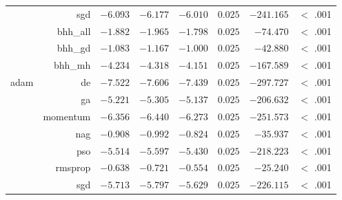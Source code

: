 \begin{table}[htb]
{\begin{tabular}{lrrrrrrr}
			                     & sgd                  & $-6.093$             & $-6.177$                                        & $-6.010$             & $0.025$              & $-241.165$           & $<$ .001    \\
			                     & bhh\_all             & $-1.882$             & $-1.965$                                        & $-1.798$             & $0.025$              & $-74.470$            & $<$ .001    \\
			                     & bhh\_gd              & $-1.083$             & $-1.167$                                        & $-1.000$             & $0.025$              & $-42.880$            & $<$ .001    \\
			                     & bhh\_mh              & $-4.234$             & $-4.318$                                        & $-4.151$             & $0.025$              & $-167.589$           & $<$ .001    \\
			adam                 & de                   & $-7.522$             & $-7.606$                                        & $-7.439$             & $0.025$              & $-297.727$           & $<$ .001    \\
			$ $                  & ga                   & $-5.221$             & $-5.305$                                        & $-5.137$             & $0.025$              & $-206.632$           & $<$ .001    \\
			                     & momentum             & $-6.356$             & $-6.440$                                        & $-6.273$             & $0.025$              & $-251.573$           & $<$ .001    \\
			                     & nag                  & $-0.908$             & $-0.992$                                        & $-0.824$             & $0.025$              & $-35.937$            & $<$ .001    \\
			                     & pso                  & $-5.514$             & $-5.597$                                        & $-5.430$             & $0.025$              & $-218.223$           & $<$ .001    \\
			                     & rmsprop              & $-0.638$             & $-0.721$                                        & $-0.554$             & $0.025$              & $-25.240$            & $<$ .001    \\
			                     & sgd                  & $-5.713$             & $-5.797$                                        & $-5.629$             & $0.025$              & $-226.115$           & $<$ .001    \\

\end{tabular}}
\end{table}
